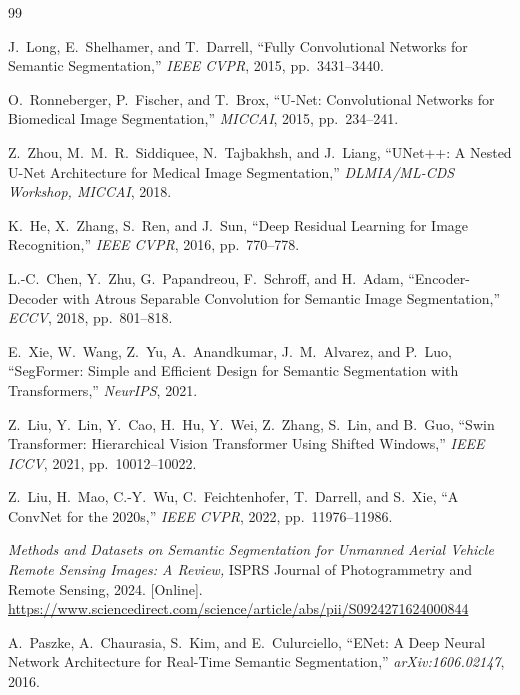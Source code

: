 \begin{thebibliography}{99}

J.~Long, E.~Shelhamer, and T.~Darrell,
``Fully Convolutional Networks for Semantic Segmentation,''
\textit{IEEE CVPR}, 2015, pp.~3431--3440.

O.~Ronneberger, P.~Fischer, and T.~Brox,
``U-Net: Convolutional Networks for Biomedical Image Segmentation,''
\textit{MICCAI}, 2015, pp.~234--241.

Z.~Zhou, M.~M.~R.~Siddiquee, N.~Tajbakhsh, and J.~Liang,
``UNet++: A Nested U-Net Architecture for Medical Image Segmentation,''
\textit{DLMIA/ML-CDS Workshop, MICCAI}, 2018.

K.~He, X.~Zhang, S.~Ren, and J.~Sun,
``Deep Residual Learning for Image Recognition,''
\textit{IEEE CVPR}, 2016, pp.~770--778.

L.-C.~Chen, Y.~Zhu, G.~Papandreou, F.~Schroff, and H.~Adam,
``Encoder-Decoder with Atrous Separable Convolution for Semantic Image
Segmentation,'' \textit{ECCV}, 2018, pp.~801--818.

E.~Xie, W.~Wang, Z.~Yu, A.~Anandkumar, J.~M.~Alvarez, and P.~Luo,
``SegFormer: Simple and Efficient Design for Semantic Segmentation with
Transformers,'' \textit{NeurIPS}, 2021.

Z.~Liu, Y.~Lin, Y.~Cao, H.~Hu, Y.~Wei, Z.~Zhang, S.~Lin, and B.~Guo,
``Swin Transformer: Hierarchical Vision Transformer Using Shifted Windows,''
\textit{IEEE ICCV}, 2021, pp.~10012--10022.

Z.~Liu, H.~Mao, C.-Y.~Wu, C.~Feichtenhofer, T.~Darrell, and S.~Xie,
``A ConvNet for the 2020s,'' \textit{IEEE CVPR}, 2022, pp.~11976--11986.

\textit{Methods and Datasets on Semantic Segmentation for Unmanned Aerial Vehicle
Remote Sensing Images: A Review,}
ISPRS Journal of Photogrammetry and Remote Sensing, 2024.
[Online]. \url{https://www.sciencedirect.com/science/article/abs/pii/S0924271624000844}

A.~Paszke, A.~Chaurasia, S.~Kim, and E.~Culurciello,
``ENet: A Deep Neural Network Architecture for Real-Time Semantic Segmentation,''
\textit{arXiv:1606.02147}, 2016.


\end{thebibliography}
